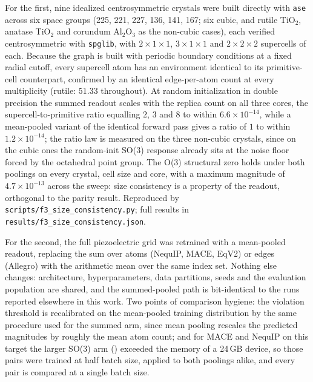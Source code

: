 For the first, nine idealized centrosymmetric crystals were built directly with \texttt{ase} across six space groups (225, 221, 227, 136, 141, 167; six cubic, and rutile TiO$_2$, anatase TiO$_2$ and corundum Al$_2$O$_3$ as the non-cubic cases), each verified centrosymmetric with \texttt{spglib}, with $2\times1\times1$, $3\times1\times1$ and $2\times2\times2$ supercells of each. Because the graph is built with periodic boundary conditions at a fixed radial cutoff, every supercell atom has an environment identical to its primitive-cell counterpart, confirmed by an identical edge-per-atom count at every multiplicity (rutile: $51.33$ throughout). At random initialization in double precision the summed readout scales with the replica count on all three cores, the supercell-to-primitive ratio equalling $2$, $3$ and $8$ to within $6.6\times10^{-14}$, while a mean-pooled variant of the identical forward pass gives a ratio of $1$ to within $1.2\times10^{-14}$; the ratio law is measured on the three non-cubic crystals, since on the cubic ones the random-init SO(3) response already sits at the noise floor forced by the octahedral point group. The O(3) structural zero holds under both poolings on every crystal, cell size and core, with a maximum magnitude of $4.7\times10^{-13}$ across the sweep: size consistency is a property of the readout, orthogonal to the parity result. Reproduced by \texttt{scripts/f3\_size\_consistency.py}; full results in \texttt{results/f3\_size\_consistency.json}.

For the second, the full piezoelectric grid was retrained with a mean-pooled readout, replacing the sum over atoms (NequIP, MACE, EqV2) or edges (Allegro) with the arithmetic mean over the same index set. Nothing else changes: architecture, hyperparameters, data partitions, seeds and the evaluation population are shared, and the summed-pooled path is bit-identical to the runs reported elsewhere in this work. Two points of comparison hygiene: the violation threshold is recalibrated on the mean-pooled training distribution by the same procedure used for the summed arm, since mean pooling rescales the predicted magnitudes by roughly the mean atom count; and for MACE and NequIP on this target the larger SO(3) arm () exceeded the memory of a 24\,GB device, so those pairs were trained at half batch size, applied to both poolings alike, and every pair is compared at a single batch size.

